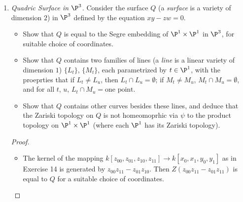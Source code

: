 \documentclass[a4paper]{article}
\begin{document}
\begin{enumerate} [label=\textbf{\arabic*.}, leftmargin=0cm]
    \item[\textbf{15.}] \textit{Quadric Surface in $\P^3$.} Consider the surface $Q$ (a \textit{surface} is a variety of dimension $2$) in $\P^3$ defined by the equation $xy - zw = 0$.
          \begin{itemize}
              \item[(a)] Show that $Q$ is equal to the Segre embedding of $\P^1 \times \P^1$ in $\P^3$, for suitable choice of coordinates.
              \item[(b)] Show that $Q$ contains two families of lines (a \textit{line} is a linear variety of dimension $1$) $\{ L_t \}$, $\{ M_t \}$, each parametrized by $t \in \P^1$, with the proeprties that if $L_t \neq L_u$, then $L_t \cap L_u = \emptyset$; if $M_t \neq M_u$, $M_t \cap M_u = \emptyset$, and for all $t$, $u$, $L_t \cap M_u = \text{one point}$.
              \item[(c)] Show that $Q$ contains other curves besides these lines, and deduce that the Zariski topology on $Q$ is not homeomoprhic via $\psi$ to the product topology on $\P^1 \times \P^1$ (where each $\P^1$ has its Zariski topology).
          \end{itemize}

          \begin{proof} $ $ \vspace{0pt}
              \begin{itemize} [leftmargin=0cm]
                  \item[(a)] The kernel of the mapping $k[z_{00}, z_{01}, z_{10}, z_{11}] \to k[x_0, x_1, y_0, y_1]$ as in Exercise 14 is generated by $z_{00} z_{11} - z_{01} z_{10}$. Then $Z(z_{00} z_{11} - z_{01} z_{11})$ is equal to $Q$ for a suitable choice of coordinates.


\end{itemize}
\end{proof}
\end{enumerate}
\end{document}
